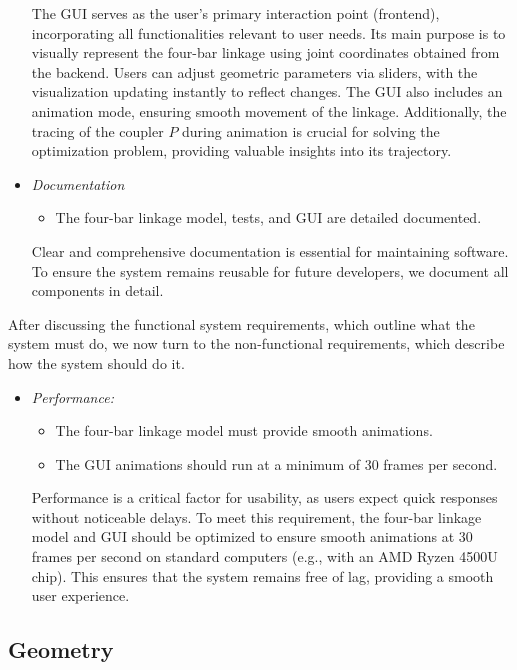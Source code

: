 \documentclass{article}
\begin{document}
\begin{itemize}
	The GUI serves as the user’s primary interaction point (frontend), incorporating all functionalities relevant to user needs. Its main purpose is to visually represent the four-bar linkage using joint coordinates obtained from the backend. Users can adjust geometric parameters via sliders, with the visualization updating instantly to reflect changes. The GUI also includes an animation mode, ensuring smooth movement of the linkage. Additionally, the tracing of the coupler $P$ during animation is crucial for solving the optimization problem, providing valuable insights into its trajectory.
	
	\item \textit{Documentation}
	\begin{itemize}
		\item The four-bar linkage model, tests, and GUI are detailed documented.
	\end{itemize}
	
	Clear and comprehensive documentation is essential for maintaining software. To ensure the system remains reusable for future developers, we document all components in detail.
\end{itemize}

After discussing the functional system requirements, which outline what the system must do, we now turn to the non-functional requirements, which describe how the system should do it.

\begin{itemize}
	\item \textit{Performance:}
	\begin{itemize}
		\item The four-bar linkage model must provide smooth animations.
		\item The GUI animations should run at a minimum of 30 frames per second. 
	\end{itemize}
	
	Performance is a critical factor for usability, as users expect quick responses without noticeable delays. To meet this requirement, the four-bar linkage model and GUI should be optimized to ensure smooth animations at 30 frames per second on standard computers (e.g., with an AMD Ryzen 4500U chip). This ensures that the system remains free of lag, providing a smooth user experience.
\end{itemize}


\subsection{Geometry}
\end{document}
